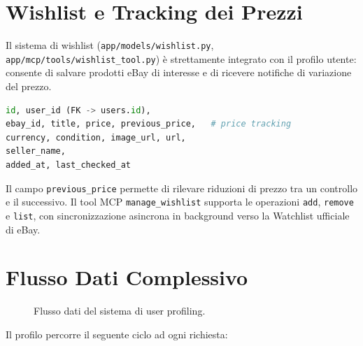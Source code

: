 \section{Wishlist e Tracking dei Prezzi}
\label{sec:wishlist}

Il sistema di wishlist (\texttt{app/models/wishlist.py},
\texttt{app/mcp/tools/wishlist\_tool.py}) è strettamente integrato con
il profilo utente: consente di salvare prodotti eBay di interesse e di
ricevere notifiche di variazione del prezzo.

\begin{lstlisting}[language=Python,caption={Campi principali del modello WishlistItem},label=lst:wishlist-model]
id, user_id (FK -> users.id),
ebay_id, title, price, previous_price,   # price tracking
currency, condition, image_url, url,
seller_name,
added_at, last_checked_at
\end{lstlisting}

Il campo \texttt{previous\_price} permette di rilevare riduzioni di
prezzo tra un controllo e il successivo. Il tool MCP
\texttt{manage\_wishlist} supporta le operazioni \texttt{add},
\texttt{remove} e \texttt{list}, con sincronizzazione asincrona in
background verso la Watchlist ufficiale di eBay.


\section{Flusso Dati Complessivo}
\label{sec:profiling-dataflow}

\begin{figure}[htbp]
    \centering
    \caption{Flusso dati del sistema di user profiling.}
    \label{fig:profiling-dataflow}
\end{figure}

Il profilo percorre il seguente ciclo ad ogni richiesta:

